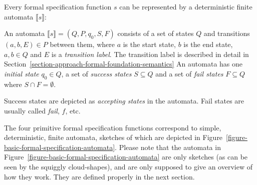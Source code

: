 Every formal specification function $s$ can be represented by a deterministic
finite automata $\llbracket s \rrbracket$:

\begin{mydef}[automata]\label{def-automata}
An automata $\llbracket s \rrbracket = (Q, P, q_0, S, F)$ consists of a set of
states $Q$ and transitions $(a, b, E) \in P$ between them, where $a$ is the
start state, $b$ is the end state, $a,b \in Q$ and $E$ is a \textit{transition
label}. The transition label is described in detail in
Section~\ref{section-approach-formal-foundation-semantics} An automata has one
\textit{initial state} $q_0 \in Q$, a set of \textit{success states} $S
\subseteq Q$ and a set of \textit{fail states} $F \subseteq Q$ where $S \cap F
= \emptyset$.

Success states are depicted as \textit{accepting states} in the automata. Fail
states are usually called \textit{fail}, $f$, etc.
\end{mydef}

The four primitive formal specification functions correspond to simple,
deterministic, finite automata, sketches of which are depicted in
Figure~\ref{figure-basic-formal-specification-automata}. Please note that the
automata in Figure~\ref{figure-basic-formal-specification-automata} are only
sketches (as can be seen by the squiggly cloud-shapes), and are only supposed
to give an overview of how they work. They are defined properly in the next
section.


